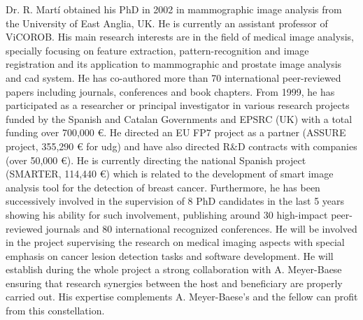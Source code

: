 Dr. R. Mart\'i obtained his PhD in 2002 in mammographic image analysis from the University of East Anglia, UK.
He is currently an assistant professor of ViCOROB.
His main research interests are in the field of medical image analysis, specially focusing on feature extraction, pattern-recognition and image registration and its application to mammographic and prostate image analysis and \ac{cad} system.
He has co-authored more than 70 international peer-reviewed papers including journals, conferences and book chapters.
From 1999, he has participated as a researcher or principal investigator in various research projects funded by the Spanish and Catalan Governments and EPSRC (UK) with a total funding over 700,000 \euro{}.
He directed an EU FP7 project as a partner (ASSURE project, 355,290 \euro{} for \ac{udg}) and have also directed R\&D contracts with companies (over 50,000 \euro{}).
He is currently directing the national Spanish project (SMARTER, 114,440 \euro{}) which is related to the development of smart image analysis tool for the detection of breast cancer.
Furthermore, he has been successively involved in the supervision of 8 PhD candidates in the last 5 years showing his ability for such involvement, publishing around 30 high-impact peer-reviewed journals and 80 international recognized conferences.
He will be involved in the project supervising the research on medical imaging aspects with special emphasis on cancer lesion detection tasks and software development.
He will establish during the whole project a strong collaboration with A. Meyer-Baese ensuring that research synergies between the host and beneficiary are properly carried out. 
His expertise complements A. Meyer-Baese's and the fellow can profit from this constellation.




